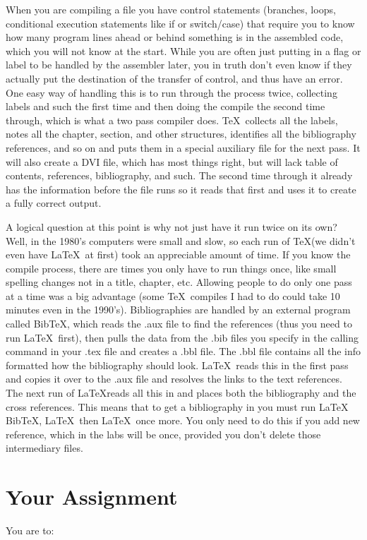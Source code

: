 When you are compiling a file you have control statements (branches, loops, conditional execution statements like if or switch/case) that require you to know how many program lines ahead or behind something is in the assembled code, which you will not know at the start.   While you are often just putting in a flag or label to be handled by the assembler later, you in truth don't even know if they actually put the destination of the transfer of control, and thus have an error.  One easy way of handling this is to run through the process twice, collecting labels and such the first time and then doing the compile the second time through, which is what a two pass compiler does.  \TeX\ collects all the labels, notes all the chapter, section, and other structures, identifies all the bibliography references, and so on and puts them in a special auxiliary file for the next pass.  It will also create a DVI file, which has most things right, but will lack table of contents, references, bibliography, and such.  The second time through it already has the information before the file runs so it reads that first and uses it to create a fully correct output.

A logical question at this point is why not just have it run twice on its own?  Well, in the 1980's computers were small and slow, so each run of \TeX (we didn't even have \LaTeX\ at first) took an appreciable amount of time.  If you know the compile process, there are times you only have to run things once, like small spelling changes not in a title, chapter, etc.  Allowing people to do only one pass at a time was a big advantage (some \TeX\ compiles I had to do could take 10 minutes even in the 1990's).  Bibliographies are handled by an external program called BibTeX, which reads the .aux file to find the references (thus you need to run \LaTeX\ first), then pulls the data from the .bib files you specify in the calling command in your .tex file and creates a .bbl file.  The .bbl file contains all the info formatted how the bibliography should look.  \LaTeX\ reads this in the first pass and copies it over to the .aux file and resolves the links to the text references.  The next run of \LaTeX reads all this in and places both the bibliography and the cross references.  This means that to get a bibliography in you must run \LaTeX\, BibTeX, \LaTeX\, then \LaTeX\ once more.  You only need to do this if you add new reference, which in the labs will be once, provided you don't delete those intermediary files.

\section{Your Assignment}

You are to:
